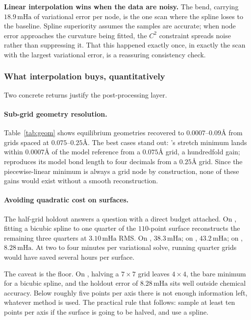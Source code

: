 \documentclass[sigconf,screen,nonacm]{acmart}
\newcommand{\mHa}{\,\text{mHa}}
\newcommand{\Ang}{\text{\AA}}
\begin{document}
\textbf{Linear interpolation wins when the data are noisy.} The 
bend, carrying $18.9\mHa$ of variational error per node, is the one scan
where the spline loses to the baseline. Spline superiority assumes the
samples are accurate; when node error approaches the curvature being fitted,
the $C^2$ constraint spreads noise rather than suppressing it. That this
happened exactly once, in exactly the scan with the largest variational
error, is a reassuring consistency check.

\subsubsection{What interpolation buys, quantitatively}

Two concrete returns justify the post-processing layer.

\paragraph{Sub-grid geometry resolution.}
Table~\ref{tab:geom} shows equilibrium geometries recovered to
$0.0007$--$0.09\Ang$ from grids spaced at $0.075$--$0.25\Ang$. The best cases
stand out: 's stretch minimum lands within $0.0007\Ang$ of the model
reference from a $0.075\Ang$ grid, a hundredfold gain;  reproduces
its model bond length to four decimals from a $0.25\Ang$ grid. Since the
piecewise-linear minimum is always a grid node by construction, none of these
gains would exist without a smooth reconstruction.

\paragraph{Avoiding quadratic cost on surfaces.}
The half-grid holdout answers a question with a direct budget attached. On
, fitting a bicubic spline to one quarter of the $110$-point surface
reconstructs the remaining three quarters at $3.10\mHa$ RMS. On ,
$38.3\mHa$; on , $43.2\mHa$; on , $8.28\mHa$. At two to four
minutes per variational solve, running quarter grids would have saved
several hours per surface.

The caveat is the floor. On , halving a $7\times7$ grid leaves
$4\times4$, the bare minimum for a bicubic spline, and the holdout error of
$8.28\mHa$ sits well outside chemical accuracy. Below roughly five points per
axis there is not enough information left, whatever method is used. The
practical rule that follows: sample at least ten points per axis if the
surface is going to be halved, and use a spline.
\end{document}
